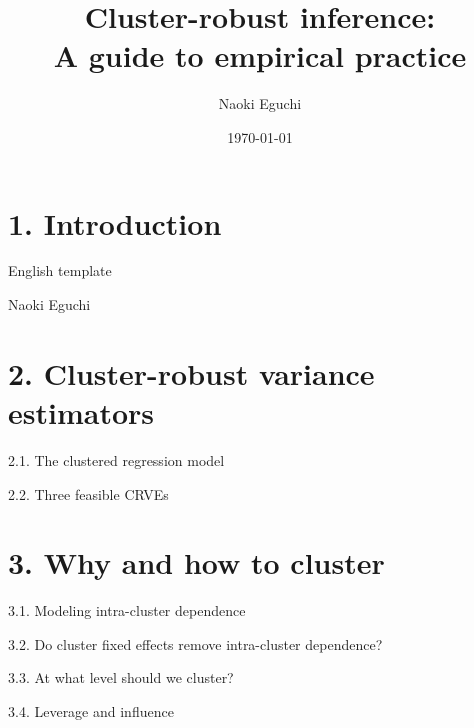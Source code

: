 \documentclass[xcolor=svgnames,dvipdfmx,cjk,aspectratio=169]{beamer}
\begin{document}
 

\title{Cluster-robust inference:\\ \small{A guide to empirical practice}}
\author{Naoki Eguchi}          
\date{\today}

\begin{frame}                  
  \titlepage                     
\end{frame}

\section{1. Introduction}

\begin{frame}{English template}
\begin{definition}[name]
Naoki Eguchi
\end{definition}
\end{frame}

\section{2. Cluster-robust variance estimators}

\begin{frame}{2.1. The clustered regression model}
\end{frame}

\begin{frame}{2.2. Three feasible CRVEs}
\end{frame}

\section{3. Why and how to cluster}

\begin{frame}{3.1. Modeling intra-cluster dependence}
\end{frame}

\begin{frame}{3.2. Do cluster fixed effects remove intra-cluster dependence?}
\end{frame}

\begin{frame}{3.3. At what level should we cluster?}
\end{frame}

\begin{frame}{3.4. Leverage and influence}
\end{frame}
\end{document}
